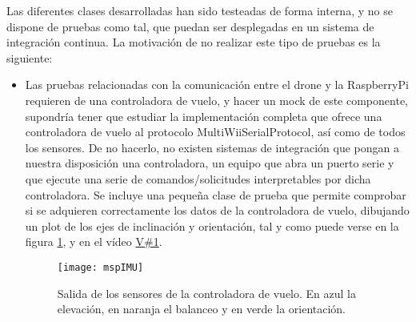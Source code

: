 Las diferentes clases desarrolladas han sido testeadas de forma interna, y no se dispone de pruebas como tal, que puedan ser desplegadas en un sistema de integración continua. 
La motivación de no realizar este tipo de pruebas es la siguiente: 
\begin{itemize}
\item Las pruebas relacionadas con la comunicación entre el drone y la RaspberryPi requieren de una controladora de vuelo, y hacer un mock de este componente, supondría tener que estudiar la implementación completa que ofrece una controladora de vuelo al protocolo MultiWiiSerialProtocol, así como de todos los sensores. De no hacerlo, no existen sistemas de integración que pongan a nuestra disposición una controladora, un equipo que abra un puerto serie y que ejecute una serie de comandos/solicitudes interpretables por dicha controladora. Se incluye una pequeña clase de prueba que permite comprobar si se adquieren correctamente los datos de la controladora de vuelo, dibujando un plot de los ejes de inclinación y orientación, tal y como puede verse en la figura \ref{fig:mspIMU}, y en el vídeo \href{https://universidaddeburgos-my.sharepoint.com/:v:/g/personal/mbm0089_alu_ubu_es/EezmUjB1BSdKp-_VQrUkIXwBPSrvQdSnmhSTd-QA3jJaIQ?e=RYEaIl}{V\#1}.
\begin{figure}[H]
	\centering
	\texttt{[image: mspIMU]}
	\caption[Recepción de la IMU mediante MSPio]{Salida de los sensores de la controladora de vuelo. En azul la elevación, en naranja el balanceo y en verde la orientación.}\label{fig:mspIMU}
\end{figure}



\end{itemize}
